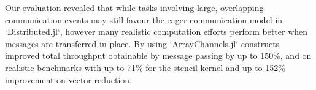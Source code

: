 \documentclass{juliacon}
\begin{document}
Our evaluation revealed that while tasks involving large, overlapping communication events may still favour the eager communication model in `Distributed.jl`, however many realistic computation efforts perform better when messages are transferred in-place. By using `ArrayChannels.jl` constructs improved total throughput obtainable by message passing by up to 150\%, and on realistic benchmarks with up to 71\% for the stencil kernel and up to 152\% improvement on vector reduction.


\end{document}
